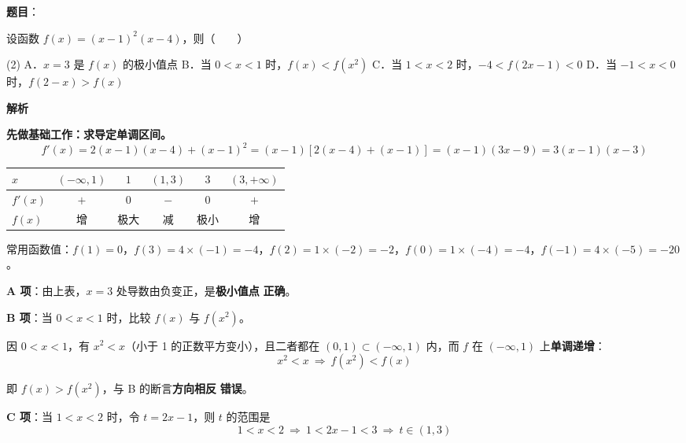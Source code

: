 \begin{answer}

\textbf{题目}：

设函数 $f(x)=(x-1)^{2}(x-4)$，则\mbox{（　　）}

\begin{gkopts}(2)
\task A．$x=3$ 是 $f(x)$ 的极小值点
\task B．当 $0<x<1$ 时，$f(x)<f\left(x^{2}\right)$
\task C．当 $1<x<2$ 时，$-4<f(2x-1)<0$
\task D．当 $-1<x<0$ 时，$f(2-x)>f(x)$
\end{gkopts}

\textbf{解析}

\textbf{先做基础工作：求导定单调区间。}
\nopagebreak[4]
\[f'(x)=2(x-1)(x-4)+(x-1)^{2}=(x-1)\left[2(x-4)+(x-1)\right]=(x-1)(3x-9)=3(x-1)(x-3)\]

\begin{center}
\begin{tabular}{lccccc}
\toprule
$x$ & $(-\infty,1)$ & $1$ & $(1,3)$ & $3$ & $(3,+\infty)$ \\
\midrule
$f'(x)$ & $+$ & $0$ & $-$ & $0$ & $+$ \\
$f(x)$ & 增 & 极大 & 减 & 极小 & 增 \\
\bottomrule
\end{tabular}
\end{center}

常用函数值：$f(1)=0$，$f(3)=4\times(-1)=-4$，$f(2)=1\times(-2)=-2$，$f(0)=1\times(-4)=-4$，$f(-1)=4\times(-5)=-20$。

\par\medskip

\textbf{A 项}：由上表，$x=3$ 处导数由负变正，是\textbf{极小值点}  \textbf{正确}。

\par\medskip

\textbf{B 项}：当 $0<x<1$ 时，比较 $f(x)$ 与 $f\left(x^{2}\right)$。

因 $0<x<1$，有 $x^{2}<x$（小于 1 的正数平方变小），且二者都在 $(0,1)\subset(-\infty,1)$ 内，而 $f$ 在 $(-\infty,1)$ 上\textbf{单调递增}：
\nopagebreak[4]
\[x^{2}<x\ \Longrightarrow\ f\left(x^{2}\right)<f(x)\]

即 $f(x)>f\left(x^{2}\right)$，与 B 的断言\textbf{方向相反}  \textbf{错误}。

\par\medskip

\textbf{C 项}：当 $1<x<2$ 时，令 $t=2x-1$，则 $t$ 的范围是
\nopagebreak[4]
\[1<x<2\ \Longrightarrow\ 1<2x-1<3\ \Longrightarrow\ t\in(1,3)\]


\end{answer}

